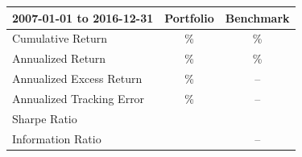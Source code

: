 \documentclass[11pt]{article}
\begin{document}
\begin{itemize}
		\begin{table}[htbp]
			\def\arraystretch{1.4}
			\begin{center}
				\begin{tabular}{|l|c|c|}
					\hline
					\textbf{2007-01-01 to 2016-12-31}& 
					\textbf{Portfolio}& 
					\textbf{Benchmark} \\
					\hline
					Cumulative Return& 
					{\%}& 
					{\%} \\
					\hline
					Annualized Return& 
					{\%}& 
					{\%} \\
					\hline
					Annualized Excess Return& 
					{\%}& 
					-- \\
					\hline
					Annualized Tracking Error& 
					{\%}& 
					-- \\
					\hline
					Sharpe Ratio& 
					& 
					\\
					\hline
					Information Ratio& 
					& 
					-- \\
					\hline
				\end{tabular}
				\label{tab1}
			\end{center}
		\end{table}



\end{itemize}
\end{document}
